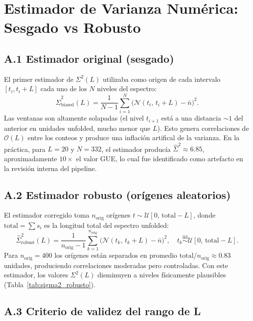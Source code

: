\documentclass[12pt, a4paper]{article}
\begin{document}
\appendix
\section{Estimador de Varianza Numérica: Sesgado vs Robusto}
\label{app:estimador}

\subsection*{A.1 Estimador original (sesgado)}

El primer estimador de $\Sigma^2(L)$ utilizaba como origen de cada
intervalo $[t_i, t_i + L]$ cada uno de los $N$ niveles del espectro:
\[
  \hat{\Sigma}^2_\text{biased}(L)
    = \frac{1}{N-1}\sum_{i=1}^{N}\bigl(\mathcal{N}(t_i,\,t_i+L) - \bar{n}\bigr)^2.
\]
Las ventanas son altamente solapadas (el nivel $t_{i+1}$ está a una
distancia $\sim 1$ del anterior en unidades unfolded, mucho menor que $L$).
Esto genera correlaciones de $\mathcal{O}(L)$ entre los conteos y produce
una inflación artifical de la varianza. En la práctica, para $L = 20$
y $N = 332$, el estimador producía $\hat{\Sigma}^2 \approx 6.85$,
aproximadamente $10\times$ el valor GUE, lo cual fue identificado como
artefacto en la revisión interna del pipeline.

\subsection*{A.2 Estimador robusto (orígenes aleatorios)}

El estimador corregido toma $n_\text{orig}$ orígenes
$t \sim \mathcal{U}[0,\, \text{total} - L]$, donde
$\text{total} = \sum s_i$ es la longitud total del espectro unfolded:
\[
  \hat{\Sigma}^2_\text{robust}(L)
    = \frac{1}{n_\text{orig}-1}
      \sum_{k=1}^{n_\text{orig}}
      \bigl(\mathcal{N}(t_k,\,t_k+L) - \bar{n}\bigr)^2,
  \quad t_k \overset{\text{iid}}{\sim} \mathcal{U}[0,\,\text{total}-L].
\]
Para $n_\text{orig} = 400$ los orígenes están separados en promedio
$\text{total}/n_\text{orig} \approx 0.83$ unidades, produciendo
correlaciones moderadas pero controladas. Con este estimador, los
valores $\Sigma^2(L)$ disminuyen a niveles físicamente plausibles
(Tabla~\ref{tab:sigma2_robusto}).

\subsection*{A.3 Criterio de validez del rango de L}
\end{document}
